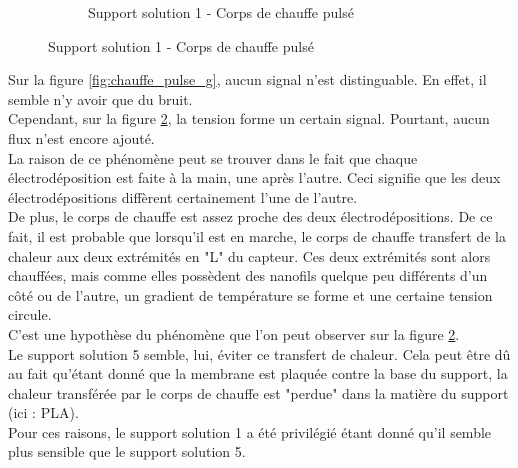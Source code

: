 \begin{figure}[H]
\begin{subfigure}[b]{0.45\textwidth}
        \caption{Support solution 1 - Corps de chauffe pulsé}
        \label{fig:chauffe_pulse_b}
    \end{subfigure}
\end{figure}

Sur la figure \ref{fig:chauffe_pulse_g}, aucun signal n'est distinguable. En effet, il semble n'y avoir que du bruit. \\

Cependant, sur la figure \ref{fig:chauffe_pulse_b}, la tension forme un certain signal. Pourtant, aucun flux n'est encore ajouté. \\
La raison de ce phénomène peut se trouver dans le fait que chaque électrodéposition est faite à la main, une après l'autre. Ceci signifie que
les deux électrodépositions diffèrent certainement l'une de l'autre. \\
De plus, le corps de chauffe est assez proche des deux électrodépositions. De ce fait, il est probable que lorsqu'il est en marche, le corps de
chauffe transfert de la chaleur aux deux extrémités en "L" du capteur. Ces deux extrémités sont alors chauffées, mais comme elles possèdent des nanofils
quelque peu différents d'un côté ou de l'autre, un gradient de température se forme et une certaine tension circule. \\
C'est une hypothèse du phénomène que l'on peut observer sur la figure \ref{fig:chauffe_pulse_b}.\\

Le support solution 5 semble, lui, éviter ce transfert de chaleur. Cela peut être dû au fait qu'étant donné que la membrane est plaquée contre
la base du support, la chaleur transférée par le corps de chauffe est "perdue" dans la matière du support (ici : PLA).\\

Pour ces raisons, le support solution 1 a été privilégié étant donné qu'il semble plus sensible que le support solution 5.\\

